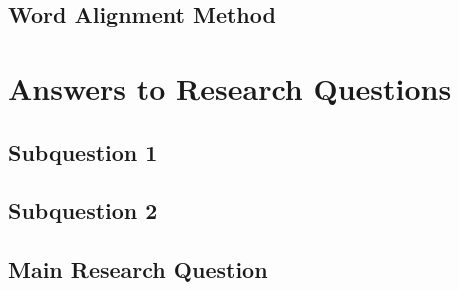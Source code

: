 \subsection{Word Alignment Method}















\section{Answers to Research Questions}
\label{sec:Discussion:Answers}

\subsection{Subquestion 1} %
\label{sec:Discussion:Answers:1}


\subsection{Subquestion 2} %
\label{sec:Discussion:Answers:2}

\subsection{Main Research Question} %
\label{sec:Discussion:Answers:Main}


